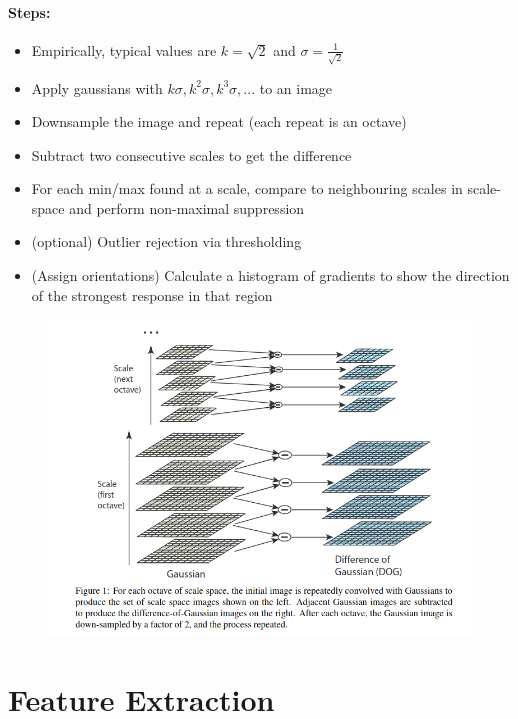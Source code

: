 \documentclass[]{article}
\begin{document}
		\paragraph{Steps:}
		\begin{itemize}
			\item Empirically, typical values are $k = \sqrt{2}$ and $\sigma=\frac{1}{\sqrt{2}}$
			\item Apply gaussians with $k\sigma, k^2\sigma, k^3\sigma, ...$ to an image
			\item Downsample the image and repeat (each repeat is an octave)
			\item Subtract two consecutive scales to get the difference
			\item For each min/max found at a scale, compare to neighbouring scales in scale-space and perform non-maximal suppression
			\item (optional) Outlier rejection via thresholding
			\item (Assign orientations) Calculate a histogram of gradients to show the direction of the strongest response in that region
		\end{itemize}
	\newpage		
		\begin{figure}[h!]
			\begin{center}
				\includegraphics[width=\linewidth]{./images/sift.png}
				\label{fig:sift}
			\end{center}
		\end{figure}
	
		
\section{Feature Extraction}
\end{document}
